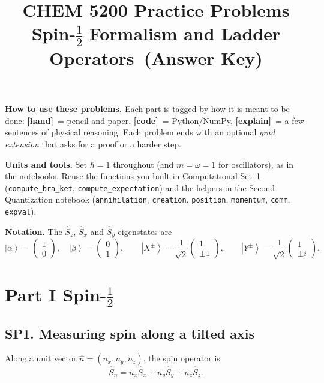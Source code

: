 \documentclass[11pt]{article}
\title{CHEM 5200 Practice Problems\\[2pt]
  \large Spin-$\tfrac12$ Formalism and Ladder Operators\ifsolutions\ (Answer Key)\fi}
\author{}
\date{}
\newcommand{\tagbox}[2]{\textcolor{#1}{\textsf{\textbf{[#2]}}}}
\newcommand{\hand}{\tagbox{handc}{hand}}
\newcommand{\code}{\tagbox{codec}{code}}
\newcommand{\expl}{\tagbox{explc}{explain}}
\newcommand{\ket}[1]{\left|#1\right\rangle}
\newcommand{\Sop}{\hat{S}}
\newcommand{\cvec}[2]{\begin{pmatrix}#1\\#2\end{pmatrix}}
\newcommand{\py}[1]{\texttt{#1}}
\begin{document}
\maketitle
\vspace{-3em}

\begin{setup}
\textbf{How to use these problems.}
Each part is tagged by how it is meant to be done:
\hand\ = pencil and paper, \code\ = Python/NumPy, \expl\ = a few sentences of physical reasoning.
Each problem ends with an optional \emph{grad extension} that asks for a proof or a harder step.

\textbf{Units and tools.} Set $\hbar = 1$ throughout (and $m=\omega=1$ for oscillators), as in the notebooks.
Reuse the functions you built in Computational Set~1 (\py{compute\_bra\_ket}, \py{compute\_expectation})
and the helpers in the Second Quantization notebook (\py{annihilation}, \py{creation}, \py{position},
\py{momentum}, \py{comm}, \py{expval}).

\textbf{Notation.} The $\Sop_z$, $\Sop_x$ and $\Sop_y$ eigenstates are
\[
\ket{\alpha}=\cvec{1}{0},\quad \ket{\beta}=\cvec{0}{1},\qquad
\ket{X^\pm}=\frac{1}{\sqrt2}\cvec{1}{\pm1},\qquad \ket{Y^\pm}=\frac{1}{\sqrt2}\cvec{1}{\pm i}.
\]
\end{setup}

\section*{Part I \quad Spin-$\tfrac12$}

\subsection*{SP1. Measuring spin along a tilted axis}

Along a unit vector $\hat n = (n_x, n_y, n_z)$, the spin operator is
\[
\Sop_n = n_x\Sop_x + n_y\Sop_y + n_z\Sop_z .
\]
\end{document}
